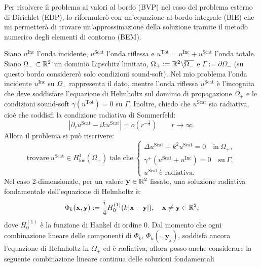 Per risolvere il problema ai valori al bordo (BVP) nel caso del problema esterno di Dirichlet (EDP), lo riformulerò con un'equazione al bordo integrale (BIE) che mi permetterà di trovare un'approssimazione della soluzione tramite il metodo numerico degli elementi di contorno (BEM).

Siano $u^{\text{Inc}}$ l'onda incidente, $u^{\text{Scat}}$ l'onda riflessa e $u^{\text{Tot}} = u^{\text{Inc}} + u^{\text{Scat}} $ l'onda totale. Siano $\Omega_- \subset \mathbb{R}^2$ un dominio Lipschitz limitato, $\Omega_+ := \mathbb{R}^2 \backslash \overline{\Omega_-}$ e $\Gamma:= \partial \Omega_-$ (su questo bordo considererò solo condizioni sound-soft). Nel mio problema l'onda incidente $u^{\text{Inc}}$ su $\Omega_-$ rappresenta il dato, mentre l'onda riflessa $u^{\text{Scat}}$ è l'incognita che deve soddisfare l'equazione di Helmholtz sul dominio di propagazione $\Omega_+$ e le condizioni sound-soft $\gamma(u^{\text{Tot}}) = 0 $ su $\Gamma$. Inoltre, chiedo che $u^{\text{Scat}}$ sia radiativa, cioè che soddisfi la condizione radiativa di Sommerfeld:
\begin{equation}
	|\partial_r u^{\text{Scat}} - iku^{\text{Scat}}| = o(r^{-\frac{1}{2}}) \qquad r \rightarrow \infty. 
\end{equation}
Allora il problema si può riscrivere:
\begin{equation}
	\text{trovare} \ u^{\text{Scat}} \in H^1_{\text{loc}} (\overline{\Omega_+}) \ \text{tale che} \ \begin{cases}
	\Delta u^{\text{Scat}} + k^2 u^{\text{Scat}} = 0 \quad \text{in} \ \Omega_+,\\
	\gamma^+(u^{\text{Scat}} + u^{\text{Inc}}) = 0 \quad \text{su} \ \Gamma,\\
	u^{\text{Scat}} \ \text{è radiativa}.
\end{cases}
\end{equation}
Nel caso 2-dimensionale, per un valore $\textbf{y} \in \mathbb{R}^2$ fissato, una soluzione radiativa fondamentale dell'equazione di Helmholtz è:
\begin{equation}
	\Phi_k(\textbf{x}, \textbf{y}) := \frac{i}{4} H^{(1)}_0 (k|\textbf{x}-\textbf{y}|), \quad \textbf{x} \ne \textbf{y} \in \mathbb{R}^2,
\end{equation}
dove $H^{(1)}_0$ è la funzione di Hankel di ordine $0$. Dal momento che ogni combinazione lineare delle componenti di $\Phi_k$, $\Phi_k(\cdot,\textbf{y}_j)$, soddisfa ancora l'equazione di Helmholtz in $\Omega_+$ ed è radiativa, allora posso anche considerare la seguente combinazione lineare continua delle soluzioni fondamentali
